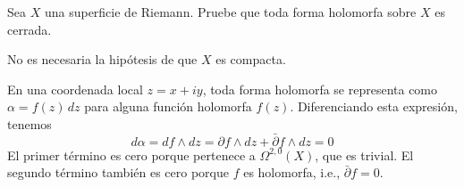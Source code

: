\begin{exercise}
Sea $X$ una superficie de Riemann. Pruebe que toda forma holomorfa sobre $X$ es cerrada.
\end{exercise}

\begin{remark}
No es necesaria la hipótesis de que $X$ es compacta.
\end{remark}

\begin{solution}
En una coordenada local $z = x + iy$, toda forma holomorfa se representa como $\alpha = f(z) \, dz$ para alguna función holomorfa $f(z)$. Diferenciando esta expresión, tenemos
$$d\alpha = df \wedge dz = \partial f \wedge dz + \bar \partial f \wedge dz = 0$$
El primer término es cero porque pertenece a $\Omega^{2,0}(X)$, que es trivial. El segundo término también es cero porque $f$ es holomorfa, i.e., $\bar \partial f = 0$.
\end{solution}
